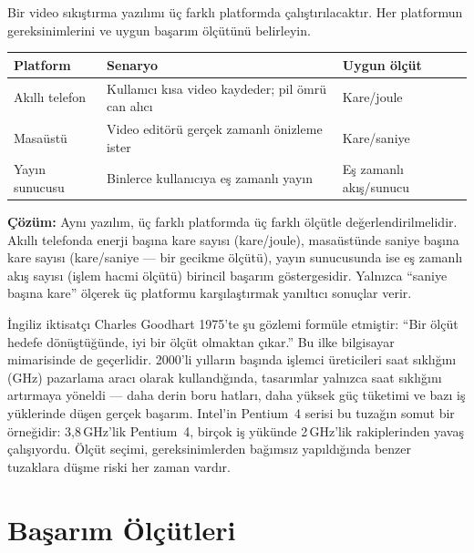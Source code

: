 \begin{ornek}[2.1]
Bir video sıkıştırma yazılımı üç farklı platformda çalıştırılacaktır. Her platformun gereksinimlerini ve uygun başarım ölçütünü belirleyin.

\begin{center}
\small
\begin{tabular}{lp{4.5cm}l}
\toprule
\textbf{Platform} & \textbf{Senaryo} & \textbf{Uygun ölçüt} \\
\midrule
Akıllı telefon & Kullanıcı kısa video kaydeder; pil ömrü can alıcı & Kare/joule \\
Masaüstü & Video editörü gerçek zamanlı önizleme ister & Kare/saniye \\
Yayın sunucusu & Binlerce kullanıcıya eş zamanlı yayın & Eş zamanlı akış/sunucu \\
\bottomrule
\end{tabular}
\end{center}

\textbf{Çözüm:} Aynı yazılım, üç farklı platformda üç farklı ölçütle değerlendirilmelidir. Akıllı telefonda enerji başına kare sayısı (kare/joule), masaüstünde saniye başına kare sayısı (kare/saniye --- bir gecikme ölçütü), yayın sunucusunda ise eş zamanlı akış sayısı (işlem hacmi ölçütü) birincil başarım göstergesidir. Yalnızca ``saniye başına kare'' ölçerek üç platformu karşılaştırmak yanıltıcı sonuçlar verir.
\end{ornek}


\begin{bilginot}
İngiliz iktisatçı Charles Goodhart 1975'te şu gözlemi formüle etmiştir: ``Bir ölçüt hedefe dönüştüğünde, iyi bir ölçüt olmaktan çıkar.'' Bu ilke bilgisayar mimarisinde de geçerlidir. 2000'li yılların başında işlemci üreticileri saat sıklığını (GHz) pazarlama aracı olarak kullandığında, tasarımlar yalnızca saat sıklığını artırmaya yöneldi --- daha derin boru hatları, daha yüksek güç tüketimi ve bazı iş yüklerinde düşen gerçek başarım. Intel'in Pentium~4 serisi bu tuzağın somut bir örneğidir: 3,8\,GHz'lik Pentium~4, birçok iş yükünde 2\,GHz'lik rakiplerinden yavaş çalışıyordu. Ölçüt seçimi, gereksinimlerden bağımsız yapıldığında benzer tuzaklara düşme riski her zaman vardır.
\end{bilginot}


\section{Başarım Ölçütleri}
\label{sec:basarim-olcut}

